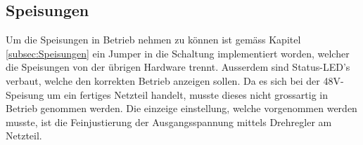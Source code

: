 \subsection{Speisungen}
\label{subsec:Inbetriebnahme_Speisungen}

Um die Speisungen in Betrieb nehmen zu können ist gemäss Kapitel \ref{subsec:Speisungen} ein Jumper in die Schaltung implementiert worden, welcher die Speisungen von der übrigen Hardware trennt. Ausserdem sind Status-LED's verbaut, welche den korrekten Betrieb anzeigen sollen. Da es sich bei der 48V-Speisung um ein fertiges Netzteil handelt, musste dieses nicht grossartig in Betrieb genommen werden. Die einzeige einstellung, welche vorgenommen werden musste, ist die Feinjustierung der Ausgangsspannung mittels Drehregler am Netzteil.
